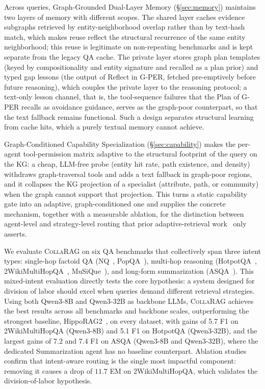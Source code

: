 \documentclass[11pt,a4paper]{article}
\newcommand{\sys}{\textsc{CollaRAG}}
\begin{document}
Across queries, Graph-Grounded Dual-Layer Memory (\S\ref{sec:memory}) maintains two layers of memory with different scopes.
The shared layer caches evidence subgraphs retrieved by entity-neighborhood overlap rather than by text-hash match, which makes reuse reflect the structural recurrence of the same entity neighborhood; this reuse is legitimate on non-repeating benchmarks and is kept separate from the legacy QA cache.
The private layer stores graph plan templates (keyed by compositionality and entity signature and recalled as a plan prior) and typed gap lessons (the output of Reflect in G-PER, fetched pre-emptively before future reasoning), which couples the private layer to the reasoning protocol; a text-only lesson channel, that is, the tool-sequence failures that the Plan of G-PER recalls as avoidance guidance, serves as the graph-poor counterpart, so that the text fallback remains functional.
Such a design separates structural learning from cache hits, which a purely textual memory cannot achieve.

Graph-Conditioned Capability Specialization (\S\ref{sec:capability}) makes the per-agent tool-permission matrix adaptive to the structural footprint of the query on the KG: a cheap, LLM-free probe (entity hit rate, path existence, and density) withdraws graph-traversal tools and adds a text fallback in graph-poor regions, and it collapses the KG projection of a specialist (attribute, path, or community) when the graph cannot support that projection.
This turns a static capability gate into an adaptive, graph-conditioned one and supplies the concrete mechanism, together with a measurable ablation, for the distinction between agent-level and strategy-level routing that prior adaptive-retrieval work~\citep{jeong2024adaptive} only asserts.


We evaluate \sys{} on six QA benchmarks that collectively span three intent types:
single-hop factoid QA (NQ~\citep{kwiatkowski2019nq}, PopQA~\citep{mallen2023popqa}),
multi-hop reasoning (HotpotQA~\citep{yang2018hotpotqa}, 2WikiMultiHopQA~\citep{ho2020constructing}, MuSiQue~\citep{trivedi2022musique}),
and long-form summarization (ASQA~\citep{stelmakh2022asqa}).
This mixed-intent evaluation directly tests the core hypothesis: a system designed for division of labor should excel when queries demand different retrieval strategies.
Using both Qwen3-8B and Qwen3-32B as backbone LLMs, \sys{} achieves the best results across all benchmarks and backbone scales, outperforming the strongest baseline, HippoRAG2~\citep{gutierrez2025hipporag2}, on every dataset, with gains of 5.7 F1 on 2WikiMultiHopQA (Qwen3-8B) and 5.1 F1 on HotpotQA (Qwen3-32B), and the largest gains of 7.2 and 7.4 F1 on ASQA (Qwen3-8B and Qwen3-32B), where the dedicated Summarization agent has no baseline counterpart.
Ablation studies confirm that intent-aware routing is the single most impactful component: removing it causes a drop of $11.7$ EM on 2WikiMultiHopQA, which validates the division-of-labor hypothesis.
\end{document}
